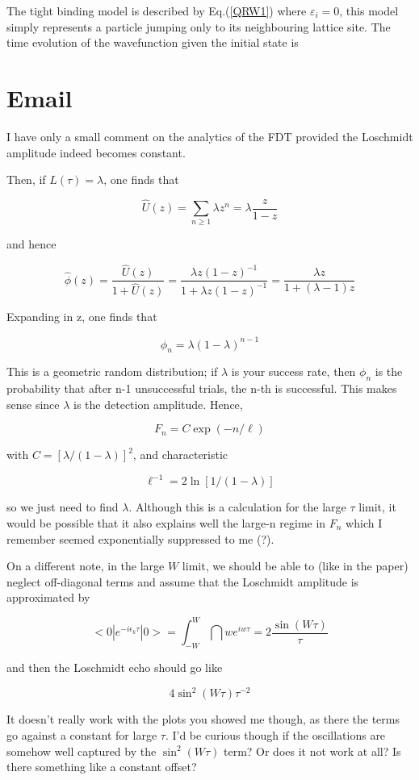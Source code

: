 \documentclass{article}
\numberwithin{equation}{section}
\newcommand{\1}{\mathbb{1}}
\begin{document}
The tight binding model is described by Eq.(\ref{QRW1}) where $\varepsilon_i=0$, this model simply represents a particle jumping only to its neighbouring lattice site. The time evolution of the wavefunction given the initial state is 










\section{Email}
I have only a small comment on the analytics of the FDT provided the Loschmidt amplitude indeed becomes constant.

Then, if $L(\tau) = \lambda$, one finds that

$$\hat{U}(z) = \sum_{n \geq 1} \lambda z^n = \lambda \frac{z}{1-z}$$

and hence

$$\hat{\phi}(z) = \frac{\hat{U}(z)}{1 + \hat{U}(z)} = \frac{\lambda z (1-z)^{-1}}{ 1 + \lambda z (1-z)^{-1} } = \frac{\lambda z }{1 + (\lambda - 1) z}$$

Expanding in z, one finds that

$$\phi_n = \lambda(1-\lambda)^{n-1}$$

This is a geometric random distribution; if $\lambda$ is your success rate, then $\phi_n$ is the probability that after n-1 unsuccessful trials, the n-th is successful. This makes sense since $\lambda$ is the detection amplitude. Hence,

$$F_n = C \exp( - n / \ell )$$

with $C = [\lambda/(1-\lambda)]^2$, and characteristic

$$\ell^{-1} = 2 \ln [1 / (1 - \lambda)]$$

so we just need to find $\lambda$. Although this is a calculation for the large $\tau$ limit, it would be possible that it also explains well the large-n regime in $F_n$ which I remember seemed exponentially suppressed to me (?).

On a different note, in the large $W$ limit, we should be able to (like in the paper) neglect off-diagonal terms and assume that the Loschmidt amplitude is approximated by

$$<0| e^{-i \epsilon_k \tau} | 0> = \int_{-W}^W \dint{w} e^{i w \tau} = 2 \frac{\sin(W \tau)}{\tau}$$

and then the Loschmidt echo should go like

$$4 \sin^2(W \tau) \tau^{-2}$$

It doesn’t really work with the plots you showed me though, as there the terms go against a constant for large $\tau.$ I’d be curious though if the oscillations are somehow well captured by the $\sin^2(W \tau)$ term? Or does it not work at all? Is there something like a constant offset?
\printbibliography  
\end{document}
